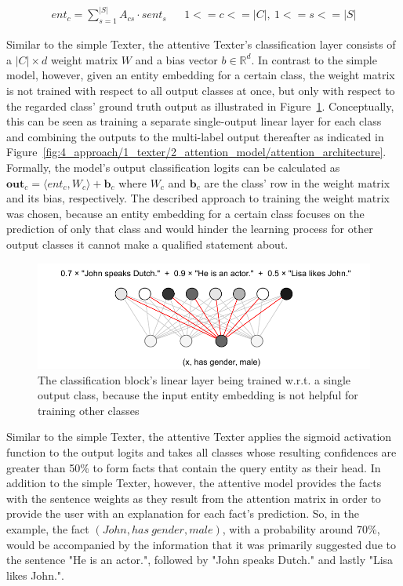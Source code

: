 \begin{align}
    ent_c = \sum_{s = 1}^{|S|} A_{cs} \cdot sent_s && 1 <= c <= |C|,~1 <= s <= |S|
    \label{eq:4_approach/1_texter/2_attention_model/ent_emb}
\end{align}

Similar to the simple Texter, the attentive Texter's classification layer consists of a $|C| \times d$ weight matrix $W$ and a bias vector $b \in \mathbb{R}^d$. In contrast to the simple model, however, given an entity embedding for a certain class, the weight matrix is not trained with respect to all output classes at once, but only with respect to the regarded class' ground truth output as illustrated in Figure~\ref{fig:4_approach/1_texter/2_attention_model/multi_linear}.  Conceptually, this can be seen as training a separate single-output linear layer for each class and combining the outputs to the multi-label output thereafter as indicated in Figure~\ref{fig:4_approach/1_texter/2_attention_model/attention_architecture}. Formally, the model's output classification logits can be calculated as $\textbf{out}_c = \langle ent_c, W_c \rangle + \textbf{b}_c$ where $W_c$ and $\textbf{b}_c$ are the class' row in the weight matrix and its bias, respectively. The described approach to training the weight matrix was chosen, because an entity embedding for a certain class focuses on the prediction of only that class and would hinder the learning process for other output classes it cannot make a qualified statement about.

\begin{figure}[t]
    \centering
    \includegraphics{4_approach/1_texter/2_attention_model/multi_linear}
    \caption{The classification block's linear layer being trained w.r.t. a single output class, because the input entity embedding is not helpful for training other classes}
    \label{fig:4_approach/1_texter/2_attention_model/multi_linear}
\end{figure}

Similar to the simple Texter, the attentive Texter applies the sigmoid activation function to the output logits and takes all classes whose resulting confidences are greater than 50\% to form facts that contain the query entity as their head. In addition to the simple Texter, however, the attentive model provides the facts with the sentence weights as they result from the attention matrix in order to provide the user with an explanation for each fact's prediction. So, in the example, the fact $(John, has~gender, male)$, with a probability around 70\%, would be accompanied by the information that it was primarily suggested due to the sentence "He is an actor.", followed by "John speaks Dutch." and lastly "Lisa likes John.".
